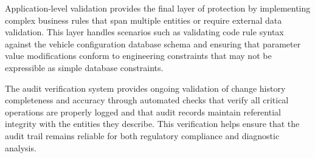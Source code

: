 Application-level validation provides the final layer of protection by implementing complex business rules that span multiple entities or require external data validation. This layer handles scenarios such as validating code rule syntax against the vehicle configuration database schema and ensuring that parameter value modifications conform to engineering constraints that may not be expressible as simple database constraints.

The audit verification system provides ongoing validation of change history completeness and accuracy through automated checks that verify all critical operations are properly logged and that audit records maintain referential integrity with the entities they describe. This verification helps ensure that the audit trail remains reliable for both regulatory compliance and diagnostic analysis.